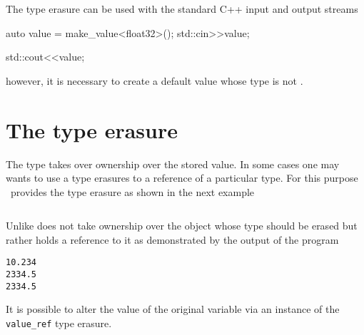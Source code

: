 The  type erasure can be used with the standard C++ input and output
streams
\begin{cppcode}
auto value = make_value<float32>();
std::cin>>value;

std::cout<<value;
\end{cppcode}
however, it is necessary to create a default value whose type is not
.

\section{The  type erasure}

The  type takes over ownership over the stored value. 
In some cases one may wants to use a type erasures to a reference of a
particular type.  For this purpose \libpnicore\ provides the 
type erasure as shown in the next example

\inputminted[fontsize=\small,
             linenos,
             firstnumber=26,
             firstline=26,
             lastline=45,
             frame=lines,
             label=examples/type\_erasure2.cpp]
{cpp}{../examples/type_erasure2.cpp}
Unlike   does not take ownership over the object
whose type should be erased but rather holds a reference to it
as demonstrated by the output of the program
\begin{verbatim}
10.234
2334.5
2334.5
\end{verbatim}
It is possible to alter the value of the original variable via an instance of
the \texttt{value\_ref} type erasure.

